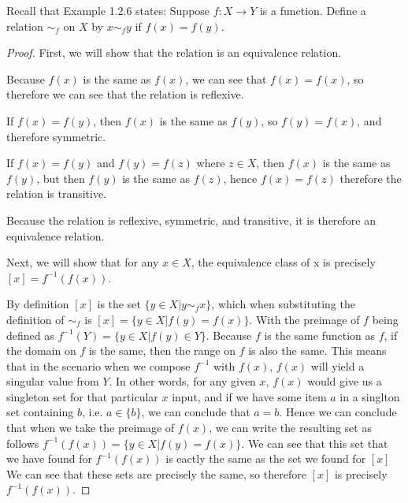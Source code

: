 \documentclass[a4paper]{article}
\begin{document}
\begin{myparindent}{0pt}
Recall that Example 1.2.6 states: Suppose $f : X \rightarrow Y$ is a function.
Define a relation $\sim_f$ on $X$ by $x \sim_f y$ if $f(x) = f(y)$.

\begin{proof}
    First, we will show that the relation is an equivalence relation. \newline

    Because $f(x)$ is the same as $f(x)$, we can see that $f(x) = f(x)$,
    so therefore we can see that the relation is reflexive. \newline

    If $f(x) = f(y)$, then $f(x)$ is the same as $f(y)$, so $f(y) = f(x)$,
    and therefore symmetric. \newline

    If $f(x) = f(y)$ and $f(y) = f(z)$ where $z \in X$, then $f(x)$ is
    the same as $f(y)$, but then $f(y)$ is the same as $f(z)$, hence $f(x) = f(z)$
    therefore the relation is transitive. \newline

    Because the relation is reflexive, symmetric, and transitive, it
    is therefore an equivalence relation. \newline

    Next, we will show that for any $x \in X$, the equivalence class of x is
    precisely $[x] = f^{-1}(f(x))$. \newline

    By definition $[x]$ is the set $\{y \in X | y \sim_f x\}$, which when substituting
    the definition of $\sim_f$ is $[x] = \{y \in X | f(y) = f(x)\}$. With the preimage
    of $f$ being defined as $f^{-1}(Y) = \{ y \in X | f(y) \in Y \}$.
    Because $f$ is the same function as $f$, if the domain on $f$ is the same,
    then the range on $f$ is also the same. This means that in the scenario
    when we compose $f^{-1}$ with $f(x)$, $f(x)$ will yield
    a singular value from $Y$. In other words, for any given $x$, $f(x)$
    would give us a singleton set for that particular $x$ input, and if we have
    some item $a$ in a singlton set containing $b$, i.e. $a \in \{b\}$, we can
    conclude that $a = b$. Hence we can conclude that when we take the preimage
    of $f(x)$, we can write the resulting set as follows
    $f^{-1}(f(x)) = \{ y \in X | f(y) = f(x) \}$. We can see
    that this set that we have found for $f^{-1}(f(x))$ is eactly the same
    as the set we found for $[x]$
    We can see that these sets are precisely the same, so therefore $[x]$ is
    precisely $f^{-1}(f(x))$.
\end{proof}


\end{myparindent}
\end{document}
